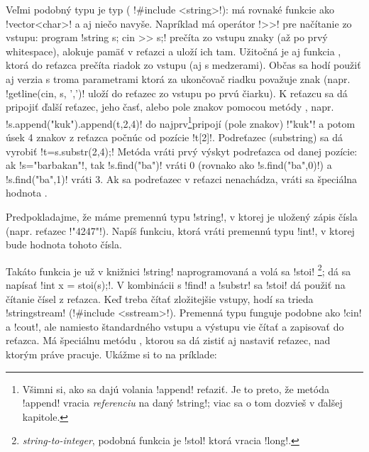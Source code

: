  Veľmi podobný typu  je typ  (
\prg!#include <string>!): má rovnaké funkcie
ako \prg!vector<char>! a aj niečo navyše. Napríklad má operátor \prg!>>!
pre načítanie zo vstupu: program \prg!string s; cin >> s;! prečíta zo vstupu
znaky (až po prvý whitespace), alokuje pamäť v reťazci  a uloží ich tam.
Užitočná je aj funkcia , ktorá do reťazca 
prečíta riadok zo vstupu (aj s medzerami). Občas sa hodí použiť aj 
verzia s troma parametrami  ktorá za ukončovač
riadku považuje znak  (napr. \prg!getline(cin, s, ',')! uloží do  reťazec zo vstupu po
prvú čiarku). K reťazcu sa dá pripojiť ďalší reťazec,
jeho časť, alebo pole znakov pomocou metódy , napr.
\prg!s.append("kuk").append(t,2,4)! do  najprv\footnote{%
  Všimni si, ako sa dajú volania \prg!append! reťaziť. Je to preto, že metóda 
  \prg!append! vracia {\em referenciu} na daný \prg!string!; viac sa o tom
  dozvieš v ďalšej kapitole.
}pripojí (pole znakov) 
\prg!"kuk"! a potom úsek 4 znakov z reťazca  počnúc od pozície \prg!t[2]!.
Podreťazec (substring) sa dá vyrobiť \prg!t=s.substr(2,4);! Metóda  
vráti prvý výskyt podreťazca od danej pozície: ak \prg!s="barbakan"!, tak
\prg!s.find("ba")! vráti 0 (rovnako ako \prg!s.find("ba",0)!)
a \prg!s.find("ba",1)! vráti 3. Ak sa podreťazec v reťazci nenachádza, vráti 
sa špeciálna hodnota . 


\begin{uloha}
  Predpokladajme, že máme premennú typu \prg!string!, v ktorej je uložený
  zápis čísla (napr. reťazec \prg!"4247"!). Napíš funkciu, ktorá vráti premennú
  typu \prg!int!, v ktorej bude hodnota tohoto čísla.
\end{uloha}

 
Takáto funkcia je už v knižnici \prg!string! naprogramovaná a volá sa \prg!stoi!
\footnote{{\em string-to-integer}, podobná funkcia je \prg!stol!
ktorá vracia \prg!long!.}; dá sa napísať \prg!int x = stoi(s);!. 
V kombinácii s \prg!find! a \prg!substr! sa \prg!stoi! dá použiť na čítanie
čísel z reťazca. Keď treba čítať zložitejšie vstupy,\label{here.stringstream}
hodí sa  trieda \prg!stringstream! (\prg!#include <sstream>!).
Premenná typu  funguje podobne ako \prg!cin! a \prg!cout!, ale
namiesto štandardného vstupu a výstupu vie čítať a zapisovať do reťazca. Má špeciálnu metódu , ktorou sa dá zistiť aj nastaviť
reťazec, nad ktorým práve pracuje. Ukážme si to na príklade:


